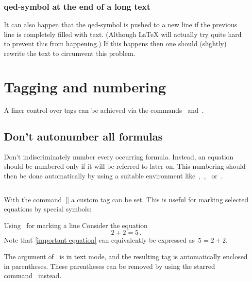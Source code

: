 \subsubsection{qed-symbol at the end of a long text}

It can also happen that the qed-symbol is pushed to a new line if the previous line is completely filled with text.
(Although {\LaTeX} will actually try quite hard to prevent this from happening.)
If this happens then one should (slightly) rewrite the text to circumvent this problem.





\section{Tagging and numbering}

A finer control over tags can be achieved via the commands~ and~.



\subsection{Don’t autonumber all formulas}
\label{dont number all formulas}

Don’t indiscriminately number every occurring formula.
Instead, an equation should be numbered only if it will be referred to later on.
This numbering should then be done automatically by using a suitable environment like~,~,~ or~.



\subsection{}

With the command~[\comname] a custom tag can be set.
This is useful for marking selected equations by special symbols:
\begin{showlatex}{Using~ for marking a line}
Consider the equation
\begin{equation}
\label{important equation}
  2 + 2 = 5 \,.
  \tag{\ast}
\end{equation}
Note that \cref{important equation} can equivalently be expressed as~$5 = 2 + 2$.
\end{showlatex}
The argument of~ is in text mode, and the resulting tag is automatically enclosed in parentheses.
These parentheses can be removed by using the starred command~ instead.

